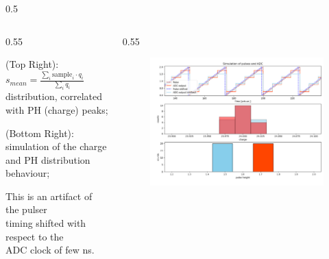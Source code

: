 \documentclass{beamer}
\begin{document}
\begin{frame}
\begin{columns}
\begin{column}{0.5\framewidth}
\begin{figure}[!h]
     \label{fig:normalhits}
\end{figure}
\end{column}
\end{columns}
\vspace{-5mm}
    \begin{columns}
    \begin{column}{0.55\framewidth}
        \setlength{\leftmargini}{1.em}
        \vspace{-2mm}
      \begin{itemize}
 {\footnotesize
\item (Top Right): $s_{mean} = \frac{\sum_i \text{sample}_i \cdot q_i }{\sum_i q_i} $ distribution, correlated with PH (charge) peaks;
\item (Bottom Right): simulation of the charge and PH distribution \\ behaviour;
\item This is an artifact of the pulser \\
timing shifted with respect to the \\ ADC 
clock of few ns.}

\end{itemize}
\end{column}
\begin{column}{0.55\framewidth}
         \begin{figure}[!h]
      \centering
      \hspace*{-2em}
      \includegraphics[width=1.05\columnwidth]{figures/png/pres.png}
     \label{fig:normalhits}
\end{figure}
\end{column}
\end{columns}
\end{frame}
\end{document}
